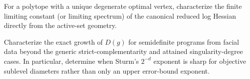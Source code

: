 \begin{openproblem}
\label{open:degenerate-vertex-constants}
For a polytope with a unique degenerate optimal vertex, characterize the
finite limiting constant (or limiting spectrum) of the canonical reduced log
Hessian directly from the active-set geometry.
\end{openproblem}

\begin{openproblem}
\label{open:facial-chord-growth}
Characterize the exact growth of $D(g)$ for semidefinite programs from facial
data beyond the generic strict-complementarity and attained
singularity-degree cases.  In particular, determine when Sturm's
$2^{-d}$ exponent is sharp for objective sublevel diameters rather than only
an upper error-bound exponent.
\end{openproblem}
